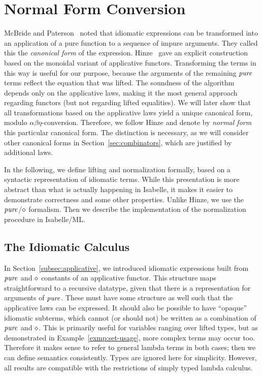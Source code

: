 \section{Normal Form Conversion}\label{sec:normal-form}

McBride and Paterson~\cite{mcbride08} noted that idiomatic expressions can
be transformed into an application of a pure function to a sequence of impure
arguments.
They called this the \emph{canonical form} of the expression.
Hinze~\cite[Section~3.3]{hinze10} gave an explicit construction based on the
monoidal variant of applicative functors.  %
Transforming the terms in this way is useful for our purpose, because the
arguments of the remaining $\operatorname{\mathit{pure}}$ terms reflect the equation that was lifted.
The soundness of the algorithm depends only on the applicative laws, making it
the most general approach regarding functors (but not regarding lifted
equalities).
We will later show that all transformations based on the applicative laws yield
a unique canonical form, modulo $\alpha\beta\eta$-conversion.
Therefore, we follow Hinze and denote by \emph{normal form} this particular
canonical form.
The distinction is necessary, as we will consider other canonical forms in
Section~\ref{sec:combinators}, which are justified by additional laws.

In the following, we define lifting and normalization formally, based on a
syntactic representation of idiomatic terms.
While this presentation is more abstract than what is actually happening in
Isabelle, it makes it easier to demonstrate correctness and some other
properties.
Unlike Hinze, we use the $\operatorname{\mathit{pure}}$/$\diamond$ formalism.
Then we describe the implementation of the normalization procedure in
Isabelle/ML.

\subsection{The Idiomatic Calculus}\label{subsec:idiomatic-calculus}

In Section~\ref{subsec:applicative}, we introduced idiomatic expressions built
from $\operatorname{\mathit{pure}}$ and $\diamond$ constants of an applicative functor.
This structure maps straightforward to a recursive datatype, given that there
is a representation for arguments of $\operatorname{\mathit{pure}}$.
These must have some structure as well such that the applicative laws can be
expressed.
It should also be possible to have ``opaque'' idiomatic subterms, which cannot
(or should not) be written as a combination of $\operatorname{\mathit{pure}}$ and $\diamond$.
This is primarily useful for variables ranging over lifted types, but as
demonstrated in Example~\ref{exmp:set-usage}, more complex terms may occur too.
Therefore it makes sense to refer to general lambda terms in both cases;
then we can define semantics consistently.
Types are ignored here for simplicity.
However, all results are compatible with the restrictions of simply typed
lambda calculus.

